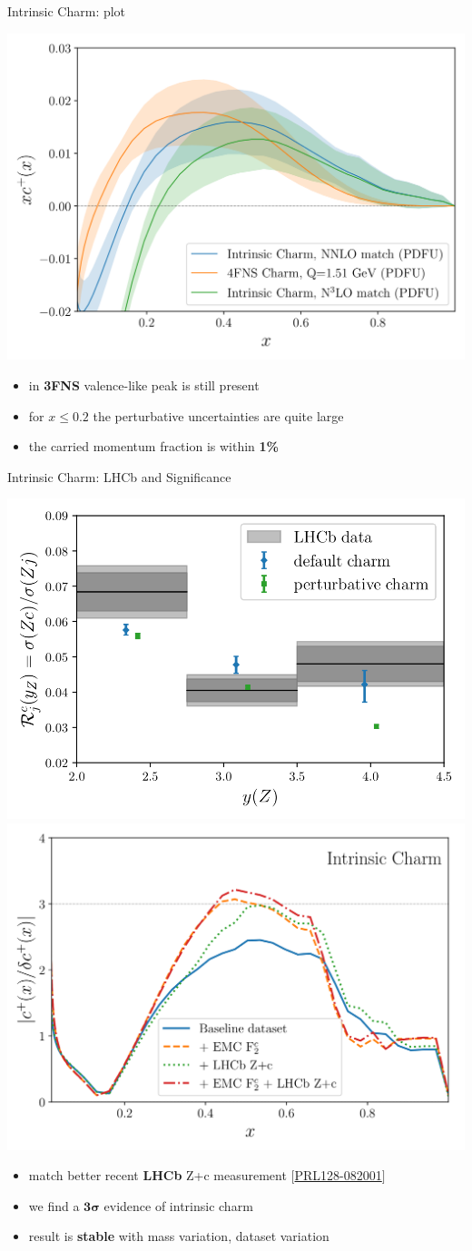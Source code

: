 \documentclass[9pt]{beamer}
\providecommand{\iRef}[1]{{\color{mLightGreen}\small $[$#1$]$}}
\begin{document}
\begin{frame}{Intrinsic Charm: \pdf{} plot}
	\begin{center}
		\includegraphics[width=.7\linewidth]{4fns_3fns_nnlo_n3lo.png}
	\end{center}

	\begin{itemize}
		\item in \textbf{3FNS} valence-like peak is still present
		\item for $x\leq 0.2$ the perturbative uncertainties are quite large
		\item the carried momentum fraction is within \textbf{1\%}
	\end{itemize}
\end{frame}

\begin{frame}{Intrinsic Charm: LHCb and Significance}
	\begin{center}
		\includegraphics[width=.47\linewidth]{lhcb-zcharm-pheno.png}%
		\quad%
		\includegraphics[width=.47\linewidth]{pull_baseline_EMC_LHCb_Zc.png}
	\end{center}

	\begin{itemize}
		\item match better recent \textbf{LHCb} Z+c measurement \iRef{\href{https://doi.org/10.1103/PhysRevLett.128.082001}{PRL128-082001}}
		\item we find a $\bm{3\sigma}$ evidence of intrinsic charm
		\item result is \textbf{stable} with mass variation, dataset variation
	\end{itemize}
\end{frame}
\end{document}
